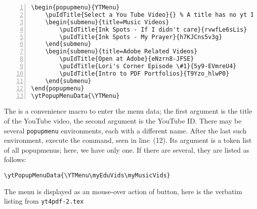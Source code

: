 \documentclass{article}
\newcommand{\YouTube}{\textsf{YouTube}}
\begin{document}
\begin{Verbatim}[numbers=left,xleftmargin=\leftmargini,fontsize=\fontsize{9}{11}\selectfont]
\begin{popupmenu}{YTMenu}
    \puIdTitle{Select a You Tube Video}{} % A title has no yt Id
    \begin{submenu}{title=Music Videos}
        \puIdTitle{Ink Spots - If I didn't care}{rvwfLe6sLis}
        \puIdTitle{Ink Spots - My Prayer}{h7KJCns5v3g}
    \end{submenu}
    \begin{submenu}{title=Adobe Related Videos}
        \puIdTitle{Open at Adobe}{eNzrn8-JFSE}
        \puIdTitle{Lori's Corner Episode \#1}{5y9-EVmreU4}
        \puIdTitle{Intro to PDF Portfolios}{T9Yzo_hlwP0}
    \end{submenu}
\end{popupmenu}
\ytPopupMenuData{\YTMenu}
\end{Verbatim}
The  is a convenience macro to enter the menu data; the
first argument is the title of the {\YouTube} video, the second argument
is the {\YouTube} ID. There may be several \texttt{popupmenu} environments, each
with a different name. After the last such environment, execute the
 command, seen in line~(12). Its argument is a token
list of all popupmenus; here, we have only one. If there are several, they
are listed as follows:
\begin{Verbatim}[xleftmargin=\leftmargini]
\ytPopupMenuData{\YTMenu\myEduVids\myMusicVids}
\end{Verbatim}

The menu is displayed as an mouse-over action of button, here is the
verbatim listing from \texttt{yt4pdf-2.tex}
\end{document}
